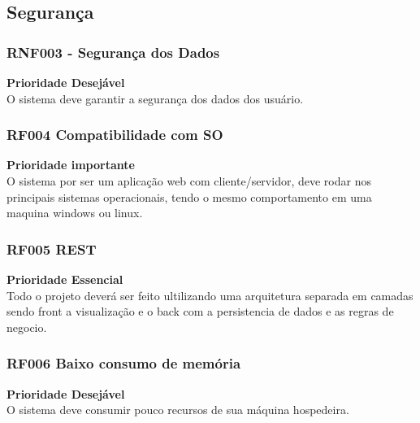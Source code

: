 \subsection{Segurança}

\subsubsection{\textbf{RNF003 - Segurança dos Dados}}

    \textbf{Prioridade Desejável} \\

    O sistema deve garantir a segurança dos dados dos usuário.


  
  \subsubsection{\textbf{RF004 Compatibilidade com SO}}

    \textbf{Prioridade importante} \\
    
    O sistema por ser um aplicação web com cliente/servidor, deve rodar
    nos principais sistemas operacionais, tendo o mesmo comportamento em 
    uma maquina windows ou linux. 



  \subsubsection{\textbf{RF005 REST}}

  \textbf{Prioridade Essencial} \\


  Todo o projeto deverá ser feito ultilizando uma arquitetura separada em camadas 
  sendo front a visualização e o back com a persistencia de dados e as regras de 
  negocio. 



  \subsubsection{\textbf{RF006 Baixo consumo de memória}} 

  \textbf{Prioridade Desejável} \\
  
  O sistema deve consumir pouco recursos de sua máquina hospedeira.



